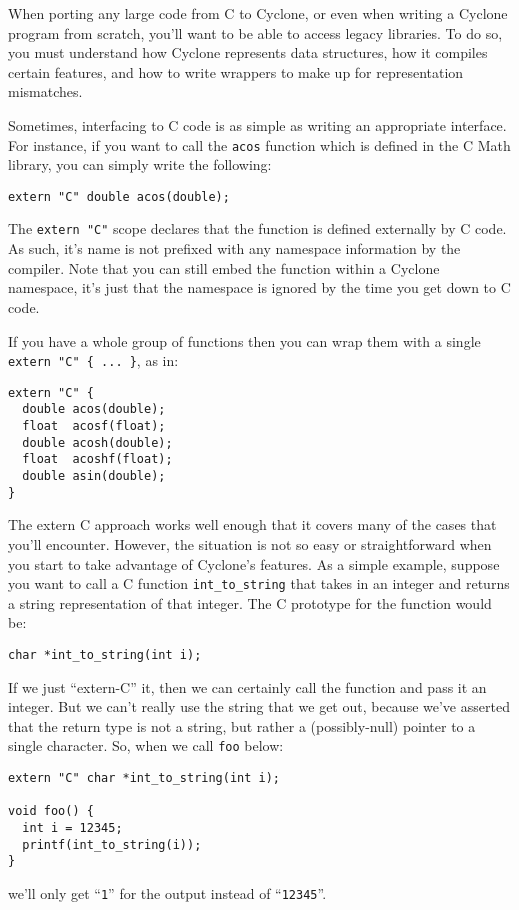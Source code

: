 When porting any large code from C to Cyclone, or even when writing
a Cyclone program from scratch, you'll want to be able to access
legacy libraries.  To do so, you must understand how Cyclone
represents data structures, how it compiles certain features,
and how to write wrappers to make up for representation mismatches.

Sometimes, interfacing to C code is as simple as writing
an appropriate interface.  For instance, if you want to
call the \texttt{acos} function which is defined in the C
Math library, you can simply write the following:
\begin{verbatim}
extern "C" double acos(double);
\end{verbatim}
The \texttt{extern "C"} scope declares that the function is
defined externally by C code.  As such, it's name is not
prefixed with any namespace information by the compiler.
Note that you can still embed the function within a Cyclone
namespace, it's just that the namespace is ignored by the
time you get down to C code.  

If you have a whole group of functions then you can wrap them with
a single \texttt{extern "C" \{ ... \}}, as in:
\begin{verbatim}
extern "C" {
  double acos(double);
  float  acosf(float);
  double acosh(double);
  float  acoshf(float);
  double asin(double);
}
\end{verbatim}

The extern C approach works well enough that it covers many
of the cases that you'll encounter.  However, the situation is
not so easy or straightforward when you start to take advantage
of Cyclone's features.  As a simple example, suppose you want
to call a C function \texttt{int\_to\_string} that takes in
an integer and returns a string representation of that integer.
The C prototype for the function would be:
\begin{verbatim}
char *int_to_string(int i);
\end{verbatim}
If we just ``extern-C'' it, then we can certainly call the function
and pass it an integer.  But we can't really use the string
that we get out, because we've asserted that the return type
is not a string, but rather a (possibly-null) pointer to a single
character.  So, when we call \texttt{foo} below:
\begin{verbatim}
extern "C" char *int_to_string(int i);

void foo() {
  int i = 12345;
  printf(int_to_string(i));
}
\end{verbatim}
we'll only get ``\texttt{1}'' for the output instead of
``\texttt{12345}''.  

